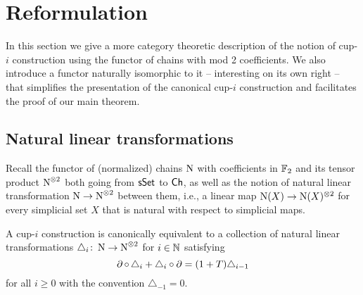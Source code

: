 
\section{Reformulation}\label{s:reformulation}

In this section we give a more category theoretic description of the notion of \mbox{cup-$i$} construction using the functor of chains with mod 2 coefficients.
We also introduce a functor naturally isomorphic to it -- interesting on its own right -- that simplifies the presentation of the canonical cup-$i$ construction and facilitates the proof of our main theorem.

\subsection{Natural linear transformations}

Recall the functor of (normalized) chains $\operatorname{N}$ with coefficients in ${\mathbb{F}_2}$ and its tensor product $\operatorname{N}^{\otimes 2}$ both going from $\mathsf{sSet}$ to $\mathsf{Ch}$, as well as the notion of natural linear transformation $\operatorname{N} \to \operatorname{N}^{\otimes 2}$ between them, i.e., a linear map $\operatorname{N}(X) \to \operatorname{N}(X)^{\otimes 2}$ for every simplicial set $X$ that is natural with respect to simplicial maps.

\begin{lemma}\label{l:coalgebra}
	A \mbox{cup-$i$} construction is canonically equivalent to a collection of natural linear transformations $\triangle_i \colon \operatorname{N} \to \operatorname{N}^{\otimes 2}$ for $i \in \mathbb{N}$ satisfying
	\[
	\operatorname{\partial} \circ \, \triangle_i + \triangle_i \circ \operatorname{\partial} =
	(1+T) \triangle_{i-1}
	\]
	for all $i \geq 0$ with the convention $\triangle_{-1} = 0$.
\end{lemma}

